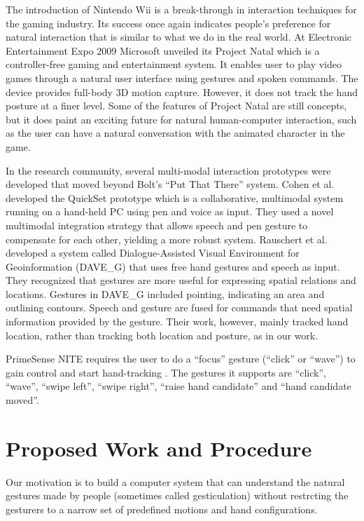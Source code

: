 The introduction of Nintendo Wii is a break-through in interaction techniques for the gaming industry. Its success once again indicates people's preference for natural interaction that is similar to what we do in the real world. At Electronic Entertainment Expo 2009 Microsoft unveiled its Project Natal which is a controller-free gaming and entertainment system. It enables user to play video games through a natural user interface using gestures and spoken commands. The device provides full-body 3D motion capture. However, it does not track the hand posture at a finer level. Some of the features of Project Natal are still concepts, but it does paint an exciting future for natural human-computer interaction, such as the user can have a natural conversation with the animated character in the game.

In the research community, several multi-modal interaction prototypes were developed that moved beyond Bolt's ``Put That There'' system. Cohen et al. \cite{Cohen97} developed the QuickSet prototype which is a collaborative, multimodal system running on a hand-held PC using pen and voice as input. They used a novel multimodal integration strategy that allows speech and pen gesture to compensate for each other, yielding a more robust system. Rauschert et al. \cite{Rauschert02} developed a system called Dialogue-Assisted Visual Environment for Geoinformation (DAVE\_G) that uses free hand gestures and speech as input. They recognized that gestures are more useful for expressing spatial relations and locations. Gestures in DAVE\_G included pointing, indicating an area and outlining contours. Speech and gesture are fused for commands that need spatial information provided by the gesture. Their work, however, mainly tracked hand location, rather than tracking both location and posture, as in our work.

PrimeSense NITE requires the user to do a ``focus'' gesture (``click'' or
``wave'') to gain control and start hand-tracking \cite{primesense-manual}. The
gestures it supports are ``click'', ``wave'', ``swipe left'', ``swipe right'',
``raise hand candidate'' and ``hand candidate moved''.

\section{Proposed Work and Procedure}
Our motivation is to build a computer system that can understand the natural
gestures made by people (sometimes called gesticulation) without restrcting the
gesturers to a narrow set of predefined motions and hand configurations.

